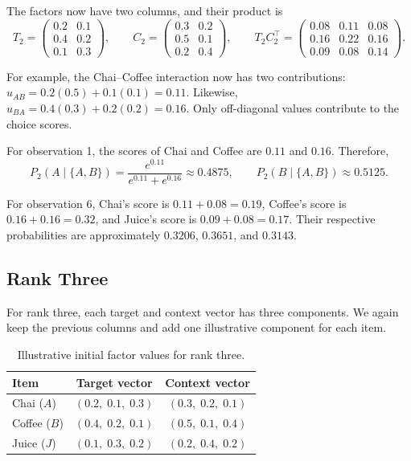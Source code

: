 \documentclass[12pt,oneside]{report}
\begin{document}
The factors now have two columns, and their product is
\begin{equation}
    T_2=
    \begin{pmatrix}
        0.2 & 0.1\\
        0.4 & 0.2\\
        0.1 & 0.3
    \end{pmatrix},
    \qquad
    C_2=
    \begin{pmatrix}
        0.3 & 0.2\\
        0.5 & 0.1\\
        0.2 & 0.4
    \end{pmatrix},
    \qquad
    T_2C_2^\top=
    \begin{pmatrix}
        0.08 & 0.11 & 0.08\\
        0.16 & 0.22 & 0.16\\
        0.09 & 0.08 & 0.14
    \end{pmatrix}.
    \label{eq:rank-two-example-product}
\end{equation}

For example, the Chai--Coffee interaction now has
two contributions: $u_{AB}=0.2(0.5)+0.1(0.1)=0.11$.
Likewise, $u_{BA}=0.4(0.3)+0.2(0.2)=0.16$.
Only off-diagonal values contribute to the choice scores.

For observation 1, the scores of Chai and Coffee
are $0.11$ and $0.16$. Therefore,
\begin{equation}
    P_2(A\mid\{A,B\})
    =\frac{e^{0.11}}{e^{0.11}+e^{0.16}}
    \approx 0.4875,
    \qquad
    P_2(B\mid\{A,B\})\approx 0.5125.
    \label{eq:rank-two-first-choice}
\end{equation}

For observation 6, Chai's score is $0.11+0.08=0.19$,
Coffee's score is $0.16+0.16=0.32$, and Juice's score
is $0.09+0.08=0.17$. Their respective probabilities
are approximately $0.3206$, $0.3651$, and $0.3143$.

\subsection{Rank Three}

For rank three, each target and context vector has
three components. We again keep the previous columns
and add one illustrative component for each item.

\begin{table}[htbp]
    \centering
    \caption{Illustrative initial factor values for rank three.}
    \label{tab:low-rank-three-factors}
    \begin{tabular}{lcc}
        \toprule
        Item & Target vector & Context vector\\
        \midrule
        Chai ($A$)   & $(0.2,\;0.1,\;0.3)$ & $(0.3,\;0.2,\;0.1)$\\
        Coffee ($B$) & $(0.4,\;0.2,\;0.1)$ & $(0.5,\;0.1,\;0.4)$\\
        Juice ($J$)  & $(0.1,\;0.3,\;0.2)$ & $(0.2,\;0.4,\;0.2)$\\
        \bottomrule
    \end{tabular}
\end{table}
\end{document}
